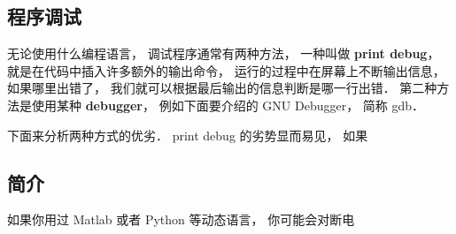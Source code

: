 
\subsection{程序调试}
无论使用什么编程语言， 调试程序通常有两种方法， 一种叫做 \textbf{print debug}， 就是在代码中插入许多额外的输出命令， 运行的过程中在屏幕上不断输出信息， 如果哪里出错了， 我们就可以根据最后输出的信息判断是哪一行出错． 第二种方法是使用某种 \textbf{debugger}， 例如下面要介绍的 GNU Debugger， 简称 gdb．

下面来分析两种方式的优劣． print debug 的劣势显而易见， 如果

\subsection{简介}
如果你用过 Matlab 或者 Python 等动态语言， 你可能会对断电
